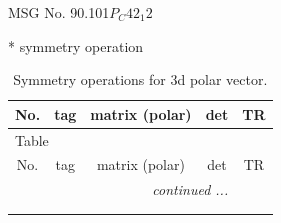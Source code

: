 \documentclass[fleqn,8pt]{jsarticle}
\begin{document}
\setcounter{MaxMatrixCols}{32}

\renewcommand{\tablename}{Table~}
\renewcommand{\figurename}{Figure~}
\begin{center}
\LARGE
MSG No. 90.101\quad$P_{C}42_{1}2$
\end{center}
* symmetry operation
\renewcommand{\arraystretch}{1.3}
\begin{longtable}{ccccc}
\caption{Symmetry operations for 3d polar vector.}
 \\
 \hline \hline
No. & tag & matrix (polar) & det & TR \\ \hline \endfirsthead

\multicolumn{4}{l}{\tablename\ \thetable{}} \\
 \hline \hline
No. & tag & matrix (polar) & det & TR \\ \hline \endhead

 \hline \hline
\multicolumn{4}{r}{\footnotesize\it continued ...} \\ \endfoot

 \hline \hline
\multicolumn{4}{r}{} \\ \endlastfoot


\end{longtable}
\end{document}
